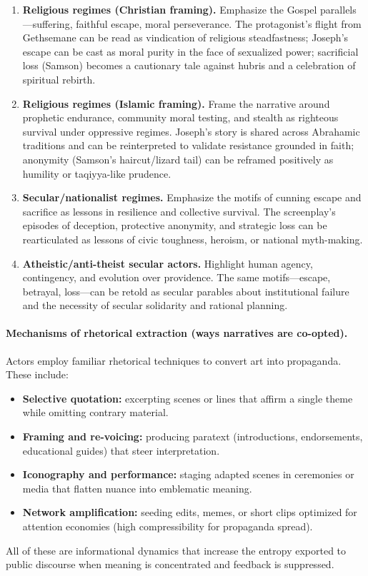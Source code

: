 \documentclass[12pt]{article}
\begin{document}
\begin{enumerate}[label=(\arabic*)]
  \item \textbf{Religious regimes (Christian framing).}  
    Emphasize the Gospel parallels—suffering, faithful escape, moral perseverance. The protagonist’s flight from Gethsemane can be read as vindication of religious steadfastness; Joseph’s escape can be cast as moral purity in the face of sexualized power; sacrificial loss (Samson) becomes a cautionary tale against hubris and a celebration of spiritual rebirth.
  \item \textbf{Religious regimes (Islamic framing).}  
    Frame the narrative around prophetic endurance, community moral testing, and stealth as righteous survival under oppressive regimes. Joseph’s story is shared across Abrahamic traditions and can be reinterpreted to validate resistance grounded in faith; anonymity (Samson’s haircut/lizard tail) can be reframed positively as humility or taqiyya-like prudence.
  \item \textbf{Secular/nationalist regimes.}  
    Emphasize the motifs of cunning escape and sacrifice as lessons in resilience and collective survival. The screenplay’s episodes of deception, protective anonymity, and strategic loss can be rearticulated as lessons of civic toughness, heroism, or national myth-making.
  \item \textbf{Atheistic/anti-theist secular actors.}  
    Highlight human agency, contingency, and evolution over providence. The same motifs—escape, betrayal, loss—can be retold as secular parables about institutional failure and the necessity of secular solidarity and rational planning.
\end{enumerate}

\paragraph{Mechanisms of rhetorical extraction (ways narratives are co-opted).}
Actors employ familiar rhetorical techniques to convert art into propaganda. These include:
\begin{itemize}
  \item \textbf{Selective quotation:} excerpting scenes or lines that affirm a single theme while omitting contrary material.
  \item \textbf{Framing and re-voicing:} producing paratext (introductions, endorsements, educational guides) that steer interpretation.
  \item \textbf{Iconography and performance:} staging adapted scenes in ceremonies or media that flatten nuance into emblematic meaning.
  \item \textbf{Network amplification:} seeding edits, memes, or short clips optimized for attention economies (high compressibility for propaganda spread).
\end{itemize}
All of these are informational dynamics that increase the entropy exported to public discourse when meaning is concentrated and feedback is suppressed.
\end{document}

